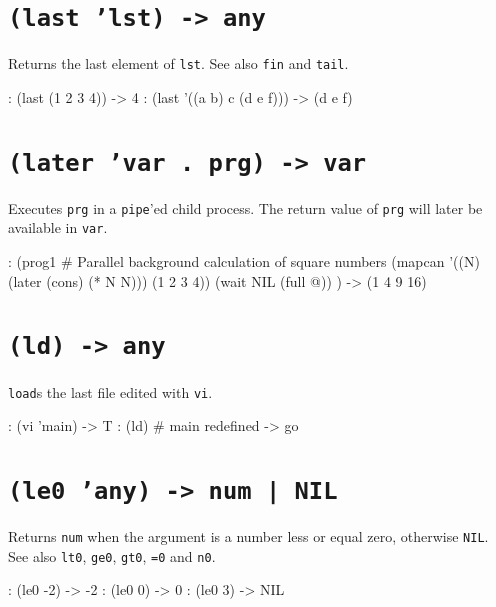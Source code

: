  
\section*{\texttt{(last 'lst) -> any}}
\label{sec:func-ref-L-(last 'lst) -> any}


Returns the last element of \texttt{lst}. See also \texttt{fin} and \texttt{tail}.


\begin{wideverbatim}
: (last (1 2 3 4))
-> 4
: (last '((a b) c (d e f)))
-> (d e f)
\end{wideverbatim}

 
\section*{\texttt{(later 'var . prg) -> var}}
\label{sec:func-ref-L-(later 'var . prg) -> var}


Executes \texttt{prg} in a \texttt{pipe}'ed child process. The return value of \texttt{prg}
will later be available in \texttt{var}.


\begin{wideverbatim}
: (prog1  # Parallel background calculation of square numbers
   (mapcan '((N) (later (cons) (* N N))) (1 2 3 4))
   (wait NIL (full @)) )
-> (1 4 9 16)
\end{wideverbatim}

 
\section*{\texttt{(ld) -> any}}
\label{sec:func-ref-L-(ld) -> any}


\texttt{load}s the last file edited with \texttt{vi}.


\begin{wideverbatim}
: (vi 'main)
-> T
: (ld)
# main redefined
-> go
\end{wideverbatim}

 
\section*{\texttt{(le0 'any) -> num | NIL}}
\label{sec:func-ref-L-(le0 'any) -> num | NIL}


Returns \texttt{num} when the argument is a number less or equal zero,
otherwise \texttt{NIL}. See also \texttt{lt0}, \texttt{ge0},
\texttt{gt0}, \texttt{=0} and \texttt{n0}.


\begin{wideverbatim}
: (le0 -2)
-> -2
: (le0 0)
-> 0
: (le0 3)
-> NIL
\end{wideverbatim}

